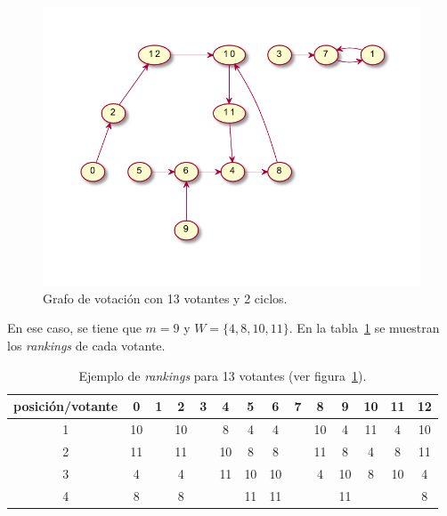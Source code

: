 \begin{figure}[h!]
    \centering
    \includegraphics[scale=.9]{Graphics/graph-13-voters-2-cycles-largest-has-4.pdf}
    \caption{Grafo de votaci\'on con 13 votantes y 2 ciclos.}
    \label{fig:graph-13-voters-2-cycles}
\end{figure}

En ese caso, se tiene que $m = 9$ y $W = \{ 4, 8, 10, 11 \}$. En la tabla~\ref{tab:rankings-13-voters} se muestran los \textit{rankings} de cada votante.

\begin{table}[h!]
    \centering
    \begin{tabular}{|c|c|c|c|c|c|c|c|c|c|c|c|c|c|}
        \hline
        posici\'on/votante & 0  & 1  & 2  & 3  & 4  & 5  & 6  & 7  & 8  & 9  & 10 & 11 & 12 \\ \hline
        1                  & 10 &    & 10 &    & 8  & 4  & 4  &    & 10 & 4  & 11 & 4  & 10 \\ \hline
        2                  & 11 &    & 11 &    & 10 & 8  & 8  &    & 11 & 8  & 4  & 8  & 11 \\ \hline
        3                  & 4  &    & 4  &    & 11 & 10 & 10 &    & 4  & 10 & 8  & 10 & 4  \\ \hline
        4                  & 8  &    & 8  &    &    & 11 & 11 &    &    & 11 &    &    & 8  \\ \hline
    \end{tabular}
    \caption{Ejemplo de \textit{rankings} para 13 votantes (ver figura~\ref{fig:graph-13-voters-2-cycles}).}
    \label{tab:rankings-13-voters}
\end{table}

